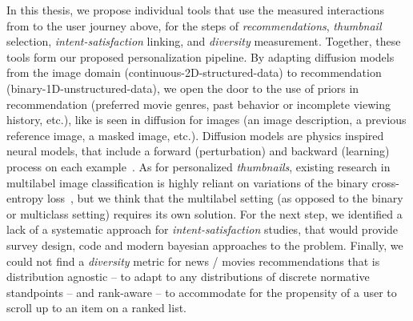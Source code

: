 In this thesis, we propose individual tools that use the measured interactions from to the user journey above, for the steps of \emph{recommendations}, \emph{thumbnail} selection, \emph{intent-satisfaction} linking, and \emph{diversity} measurement. 
Together, these tools form our proposed personalization pipeline. 
By adapting diffusion models~\cite{jascha} from the image domain (continuous-2D-structured-data) to recommendation (binary-1D-unstructured-data), we open the door to the use of priors in recommendation (preferred movie genres, past behavior or incomplete viewing history, etc.), like is seen in diffusion for images (an image description, a previous reference image, a masked image, etc.). Diffusion models are physics inspired neural models, that include a forward (perturbation) and backward (learning) process on each example~\cite{jascha}. As for personalized \emph{thumbnails}, existing research in multilabel image classification is highly reliant on variations of the binary cross-entropy loss~\cite{fisher}, but we think that the multilabel setting (as opposed to the binary or multiclass setting) requires its own solution. For the next step, we identified a lack of a systematic approach for \emph{intent-satisfaction} studies, that would provide survey design, code and modern bayesian approaches to the problem. 
 Finally, we could not find a \emph{diversity} metric for news / movies recommendations that is distribution agnostic -- to adapt to any distributions of discrete normative standpoints -- and rank-aware -- to accommodate for the propensity of a user to scroll up to an item on a ranked list.


